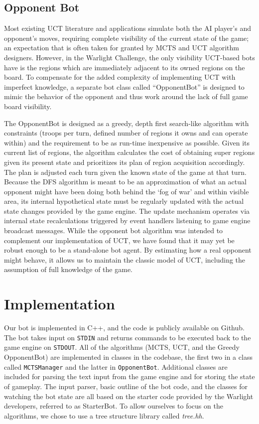 \documentclass[a4paper,11pt]{article}
\newcommand{\code}[1]{\texttt{#1}}
\begin{document}
\subsection{Opponent Bot}\label{sec:oppbot}
Most existing UCT literature and applications simulate both the AI player's and opponent's
moves, requiring complete visibility of the current state of the game; an expectation that
is often taken for granted by MCTS and UCT algorithm designers. However, in the Warlight 
Challenge, the only visibility UCT-based bots have is the regions which are immediately 
adjacent to its owned regions on the board. To compensate for the added complexity of 
implementing UCT with imperfect knowledge, a separate bot class called ``OpponentBot'' is 
designed to mimic the behavior of the opponent and thus work around the lack of full game 
board visibility.

The OpponentBot is designed as a greedy, depth first search-like algorithm with constraints 
(troops per turn, defined number of regions it owns and can operate within) and the requirement 
to be as run-time inexpensive as possible. Given its current list of regions, the algorithm calculates
the cost of obtaining super regions given its present state and prioritizes its plan of
region acquisition accordingly. The plan is adjusted each turn given the known state of the 
game at that turn. Because the DFS algorithm is meant to be an approximation of what an
actual opponent might have been doing both behind the `fog of war' and within visible area, 
its internal hypothetical state must be regularly updated with the actual state changes
provided by the game engine.  The update mechanism operates via internal state recalculations 
triggered by event handlers listening to game engine broadcast messages. While the
opponent bot algorithm was intended to complement our implementation of UCT, we have found 
that it may yet be robust enough to be a stand-alone bot agent. By estimating how a real 
opponent might behave, it allows us to maintain the classic model of UCT, including the 
assumption of full knowledge of the game.

\section{Implementation}\label{sec:impl}
Our bot is implemented in C++, and the code is publicly available on Github\cite{github}.  
The bot takes input on \code{STDIN} and returns commands to be executed back to the game 
engine on \code{STDOUT}.  All of the algorithms (MCTS, UCT, and the Greedy OpponentBot) are 
implemented in classes in the codebase, the first two in a class called \code{MCTSManager} 
and the latter in \code{OpponentBot}.  Additional classes are included for parsing the text 
input from the game engine and for storing the state of gameplay.  The input parser, basic 
outline of the bot code, and the classes for watching the bot state are all based on the 
starter code provided by the Warlight developers, referred to as StarterBot.  To allow ourselves 
to focus on the algorithms, we chose to use a tree structure library called \emph{tree.hh}\cite{treehh}.
\end{document}
